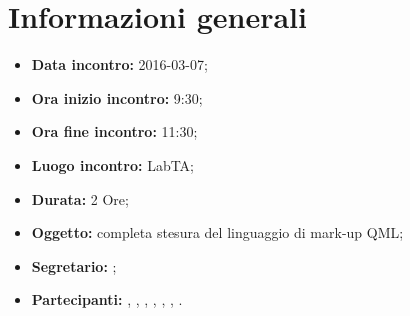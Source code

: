 \newpage
\section{Informazioni generali}
\begin{itemize}
\item \textbf{Data incontro:} 2016-03-07;
\item \textbf{Ora inizio incontro:} 9:30;
\item \textbf{Ora fine incontro:} 11:30;
\item \textbf{Luogo incontro:} LabTA;
\item \textbf{Durata:} 2 Ore;
\item \textbf{Oggetto:} completa stesura del linguaggio di mark-up QML;
\item \textbf{Segretario:} \FB;
\item \textbf{Partecipanti:} \AF, \FB, \GN, \GR, \MV, \MP, \SM.

\end{itemize}
